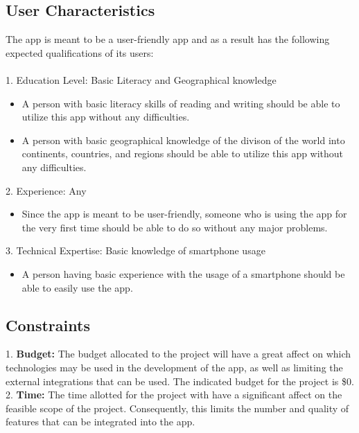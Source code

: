 \documentclass[]{article}
\begin{document}
\subsection{User Characteristics}
\label{sub:user_characteristics}
The app is meant to be a user-friendly app and as a result has the following expected qualifications of its users:\\ \\
1. Education Level: Basic Literacy and Geographical knowledge
\begin{itemize}
	\item A person with basic literacy skills of reading and writing should be able to utilize
		this app without any difficulties.
	\item A person with basic geographical knowledge of the divison of the world into continents, countries, and regions
		should be able to utilize this app without any difficulties.
\end{itemize}
2. Experience: Any
\begin{itemize}
	\item Since the app is meant to be user-friendly, someone who is using the app for the very first time
		should be able to do so without any major problems.
\end{itemize}
3. Technical Expertise: Basic knowledge of smartphone usage
\begin{itemize}
	\item A person having basic experience with the usage of a smartphone should be able to easily use the app.
\end{itemize}


\subsection{Constraints}
\label{sub:constraints} \medskip
1. \textbf{Budget: }The budget allocated to the project will have a great affect on which technologies may be used
in the development of the app, as well as limiting the external integrations that can be used. The indicated
budget for the project is \$0.\medskip \\
2. \textbf{Time: }The time allotted for the project with have a significant affect on the feasible scope of the
project. Consequently, this limits the number and quality of features that can be integrated into the app.
\end{document}
